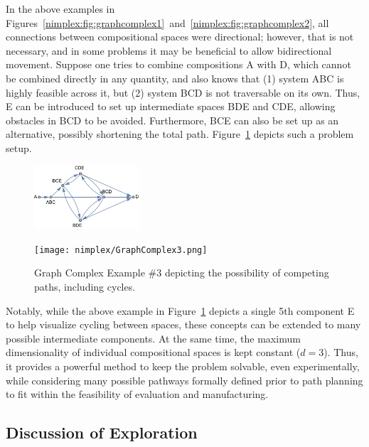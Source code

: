 In the above examples in Figures~\ref{nimplex:fig:graphcomplex1}~and~\ref{nimplex:fig:graphcomplex2}, all connections between compositional spaces were directional; however, that is not necessary, and in some problems it may be beneficial to allow bidirectional movement. Suppose one tries to combine compositions A with D, which cannot be combined directly in any quantity, and also knows that (1) system ABC is highly feasible across it, but (2) system BCD is not traversable on its own. Thus, E can be introduced to set up intermediate spaces BDE and CDE, allowing obstacles in BCD to be avoided. Furthermore, BCE can also be set up as an alternative, possibly shortening the total path. Figure~\ref{nimplex:fig:graphcomplex3} depicts such a problem setup.

\begin{figure}[h]
    \centering
    \begin{adjustbox}{valign=c}
        \includegraphics[width=0.35\textwidth]{nimplex/GraphComplexMap3.png}
    \end{adjustbox}
    \hspace{6pt}
    \begin{adjustbox}{valign=c}
        \texttt{[image: nimplex/GraphComplex3.png]}
    \end{adjustbox}
    \caption{Graph Complex Example \#3 depicting the possibility of competing paths, including cycles.} 
    \label{nimplex:fig:graphcomplex3}
\end{figure}

Notably, while the above example in Figure~\ref{nimplex:fig:graphcomplex3} depicts a single 5th component E to help visualize cycling between spaces, these concepts can be extended to many possible intermediate components. At the same time, the maximum dimensionality of individual compositional spaces is kept constant ($d=3$). Thus, it provides a powerful method to keep the problem solvable, even experimentally, while considering many possible pathways formally defined prior to path planning to fit within the feasibility of evaluation and manufacturing.




\subsection{Discussion of Exploration} \label{nimplex:sec:discussion}

